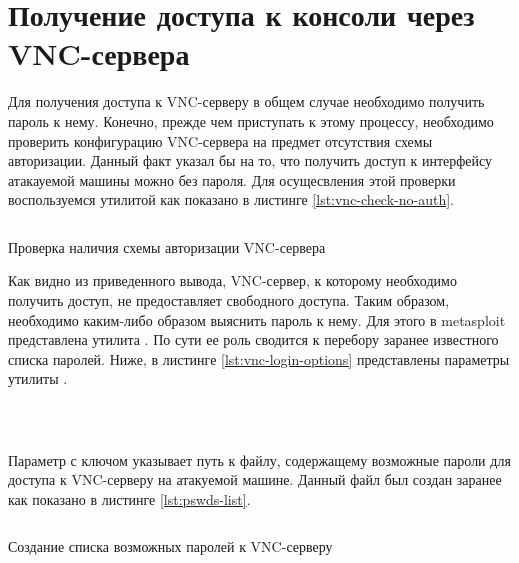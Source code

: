 \section{Получение доступа к консоли через VNC-сервера}

Для получения доступа к VNC-серверу в общем случае необходимо получить пароль к нему. Конечно, прежде чем приступать к этому процессу,
необходимо проверить конфигурацию VNC-сервера на предмет отсутствия схемы авторизации. Данный факт указал бы на то, что получить
доступ к интерфейсу атакауемой машины можно без пароля. Для осущесвления этой проверки воспользуемся утилитой  
как показано в листинге \ref{lst:vnc-check-no-auth}.

\begin{listing}[H]
    \inputminted{console}{resources/vnc/00_check_no_auth}
    \caption{Проверка наличия схемы авторизации VNC-сервера}
    \label{lst:vnc-check-no-auth}
\end{listing}

Как видно из приведенного вывода, VNC-сервер, к которому необходимо получить доступ, не предоставляет свободного доступа. Таким образом,
необходимо каким-либо образом выяснить пароль к нему. Для этого в metasploit представлена утилита . По сути ее роль 
сводится к перебору заранее известного списка паролей. Ниже, в листинге \ref{lst:vnc-login-options} представлены параметры утилиты 
.
\\ \hfill \\
\inputminted[lastline=14]{console}{resources/vnc/01_login_options}
\inputminted[firstline=15]{console}{resources/vnc/01_login_options}

Параметр с ключом  указывает путь к файлу, содержащему возможные пароли для доступа к VNC-серверу на атакуемой машине.
Данный файл был создан заранее как показано в листинге \ref{lst:pswds-list}.

\begin{listing}[H]
    \inputminted{console}{resources/vnc/02_pswds_list}
    \caption{Создание списка возможных паролей к VNC-серверу}
    \label{lst:pswds-list}
\end{listing}

